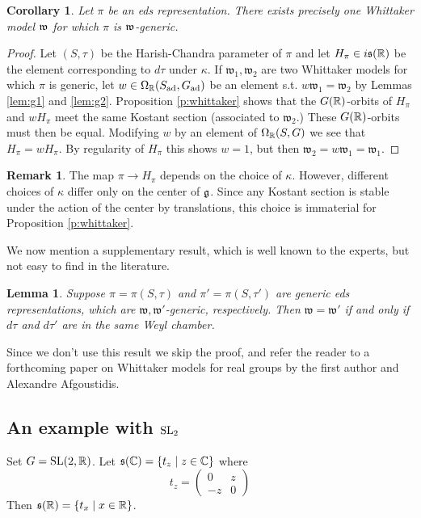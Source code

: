 \documentclass{article}
\newtheorem{lem}[thm]{Lemma}
\newtheorem{cor}[thm]{Corollary}
\theoremstyle{definition}
\newtheorem{rem}[thm]{Remark}
\numberwithin{equation}{section}
\renewcommand{\-}{\hyp{}}
\newcommand{\s}{\mathfrak s}
\newcommand{\w}{\mathfrak w}
\newcommand{\SL}{\mathrm{SL}}
\begin{document}
\begin{cor}
	Let $\pi$ be an eds representation. There exists precisely one Whittaker model $\mathfrak{w}$ for which $\pi$ is $\mathfrak{w}$-generic.
\end{cor}
\begin{proof}
	Let $(S,\tau)$ be the Harish-Chandra parameter of $\pi$ and let $H_\pi \in i\mathfrak{s}(\mathbb{R})$ be the element corresponding to $d\tau$ under $\kappa$. If $\w_1,\w_2$ are two Whittaker models for which $\pi$ is generic, let $w \in \Omega_{\mathbb{R}}(S_{\textrm{ad}},G_{\textrm{ad}})$ be an element s.t. $w\w_1=\w_2$ by Lemmas \ref{lem:g1} and \ref{lem:g2}. Proposition \ref{p:whittaker} shows that the $G(\mathbb{R})$-orbits of $H_\pi$ and $wH_\pi$ meet the same Kostant section (associated to $\w_2$.) These $G(\mathbb{R})$-orbits must then be equal. Modifying $w$ by an element of $\Omega_{\mathbb{R}}(S,G)$ we see that $H_\pi=wH_\pi$. By regularity of $H_\pi$ this shows $w=1$, but then $\w_2=w\w_1=\w_1$.
\end{proof}


\begin{rem}
  The map $\pi\rightarrow H_\pi$ depends on the choice of $\kappa$. However, different choices of $\kappa$ differ only on the center of $\mathfrak{g}$. Since any Kostant section is stable under the action of the center by translations, this choice is immaterial for Proposition \ref{p:whittaker}.
\end{rem}

We now mention  a supplementary result, which is well known to the experts, but not easy to find in the literature.

\begin{lem} \label{lem:g2'}
    Suppose $\pi=\pi(S,\tau)$ and $\pi'=\pi(S,\tau')$ are generic eds representations, which are $\w, \w'$-generic, respectively.
    Then $\w=\w'$ if and only if $d\tau$ and $d\tau'$ are in the same Weyl chamber. 
\end{lem}

Since we don't use this result we skip the proof, and refer the reader to a forthcoming paper on Whittaker models for real groups
by the first author and Alexandre Afgoustidis.


\subsection{An example with $\textrm{SL}_2$}

Set $G=\SL(2,\R)$. Let $\s(\C)=\{t_z\mid z\in\C\}$ where
$$
t_z=\begin{pmatrix}0&z\\-z&0
\end{pmatrix}
$$
Then $\s(\R)=\{t_x\mid x\in\R\}$.
\end{document}
